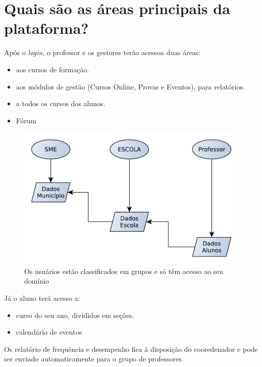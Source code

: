\section{Quais são as áreas principais da plataforma?}

Após o \textit{login}, o professor e os gestores terão acessoa duas áreas:

\begin{itemize}
\item  aos cursos de formação.
 
\item aos módulos de gestão (Cursos Online, Provas e Eventos), para relatórios. 

\item a todos os cursos dos alunos.

\item Fórum


\end{itemize}


\begin{figure}[b]
\includegraphics[width=\textwidth]{imgs/perfis_data.pdf}
\caption{Os usuários estão classificados em grupos e só têm acesso ao seu domínio}
\end{figure}


Já o aluno terá acesso a:

\begin{itemize}
\item curso do seu ano,  divididos em seções. 

\item calendário de eventos
\end{itemize}

Os relatório de frequência e desempenho fica à disposição do cooredenador e pode ser 
enviado automaticamente para o grupo de professores. 


